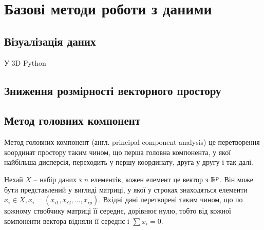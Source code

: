 \section{Базові методи роботи з даними}

\subsection{Візуалізація даних}

У 3D Python 

\subsection{Зниження розмірності векторного простору}



\subsection{Метод головних компонент}


Метод головних компонент (англ. principal component analysis) це перетворення координат простору таким чином, що перша головна компонента, у якої найбільша дисперсія, переходить у першу координату, друга у другу і так далі.

Нехай $X$ -- набір даних з $n$ елементів, кожен елемент це вектор з $\Bbb R^p$. Він може бути представлений у вигляді матриці, у якої у строках знаходяться елементи $x_i \in X, x_i = (x_{i1}, x_{i2}, \dots, x_{ip})$. Вхідні дані перетворені таким чином, що по кожному ствобчику матриці її середнє,  дорівнює нулю, тобто від кожної компоненти вектора відняли її середнє і $\sum x_i  = 0$.


